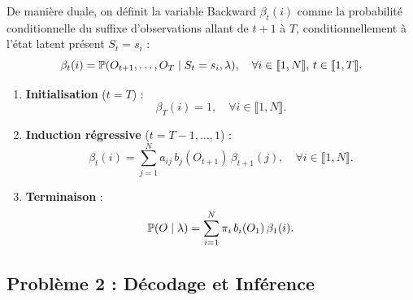 \begin{proposition}
    De manière duale, on définit la variable Backward $\beta_t(i)$ comme la probabilité conditionnelle du suffixe d'observations allant de $t+1$ à $T$, conditionnellement à l'état latent présent $S_t = s_i$ :
    \begin{equation}
        \beta_t(i) = \mathbb{P}(O_{t+1}, \dots, O_T \mid S_t = s_i, \lambda), \quad \forall i \in \llbracket 1, N \rrbracket, \, t \in \llbracket 1, T \rrbracket.
    \end{equation}

        \begin{algorithm}[H]
        \caption{Algorithme Backward}
        \begin{enumerate}
            \item \textbf{Initialisation} ($t = T$) :
            \begin{equation}
                \beta_T(i) = 1, \quad \forall i \in \llbracket 1, N \rrbracket.
            \end{equation}
            \item \textbf{Induction régressive} ($t = T-1, \dots, 1$) :
            \begin{equation}
                \beta_t(i) = \sum_{j=1}^N a_{ij} \, b_j(O_{t+1}) \, \beta_{t+1}(j), \quad \forall i \in \llbracket 1, N \rrbracket.
            \end{equation}
            \item \textbf{Terminaison} :
            \begin{equation}
                \mathbb{P}(O \mid \lambda) = \sum_{i=1}^N \pi_i \, b_i(O_1) \, \beta_1(i).
            \end{equation}
        \end{enumerate}
    \end{algorithm}
\end{proposition}

\subsection{Problème 2 : Décodage et Inférence}

